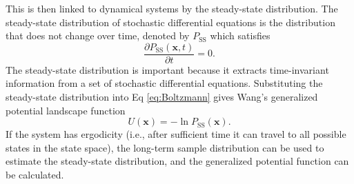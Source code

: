 This is then linked to dynamical systems by the steady-state distribution. The steady-state distribution of stochastic differential equations is the distribution that does not change over time, denoted by \(P_{\mathrm{SS}}\) which satisfies
\begin{equation}
\frac{\partial P_{\mathrm{SS}} (\boldsymbol{x},t)}{\partial t} = 0.
\label{eq:ss}
\end{equation}
The steady-state distribution is important because it extracts time-invariant information from a set of stochastic differential equations. Substituting the steady-state distribution into Eq \eqref{eq:Boltzmann} gives Wang's generalized potential landscape function \citep{wangPotentialLandscapeFlux2008}
\begin{equation}
U(\boldsymbol{x}) = - \ln P_{\mathrm{SS}}(\boldsymbol{x}).
\label{eq:Wang}
\end{equation}
If the system has ergodicity (i.e., after sufficient time it can travel to all possible states in the state space), the long-term sample distribution can be used to estimate the steady-state distribution, and the generalized potential function can be calculated.

